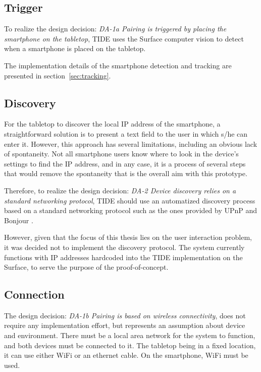 \subsection{Trigger}

To realize the design decision:
\emph{DA-1a Pairing is triggered by placing the smartphone on the tabletop},
TIDE uses the Surface computer vision to detect when a smartphone is placed on the tabletop.

The implementation details of the smartphone detection and tracking are presented in section~\ref{sec:tracking}.

\subsection{Discovery}

For the tabletop to discover the local IP address of the smartphone, a straightforward solution is to present a text field to the user in which s/he can enter it.
However, this approach has several limitations, including an obvious lack of spontaneity.
Not all smartphone users know where to look in the device's settings to find the IP address, and in any case, it is a process of several steps that would remove the spontaneity that is the overall aim with this prototype.

Therefore, to realize the design decision:
\emph{DA-2 Device discovery relies on a standard networking protocol},
TIDE should use an automatized discovery process based on a standard networking protocol such as the ones provided by UPnP \citep{upnp} and Bonjour \citep{bonjour}.

However, given that the focus of this thesis lies on the user interaction problem, 
it was decided not to implement the discovery protocol.
The system currently functions with IP addresses hardcoded into the TIDE implementation on the Surface, to serve the purpose of the proof-of-concept.

\subsection{Connection}

The design decision:
\emph{DA-1b Pairing is based on wireless connectivity},
does not require any implementation effort, but represents an assumption about device and environment.
There must be a local area network for the system to function, and both devices must be connected to it.
The tabletop being in a fixed location, it can use either WiFi or an ethernet cable.
On the smartphone, WiFi must be used.

